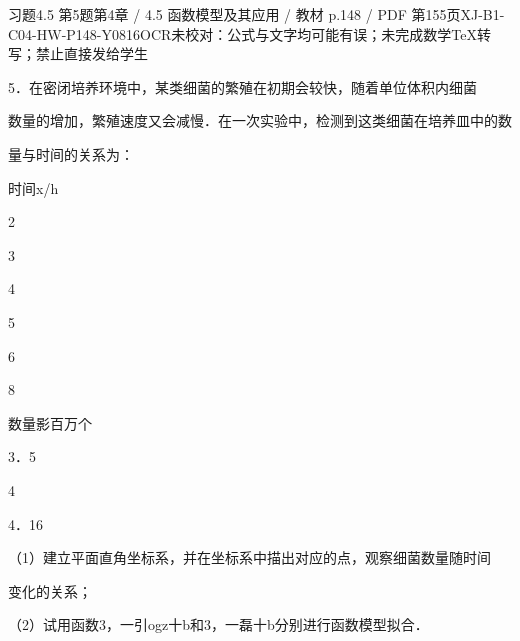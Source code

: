 \begin{bankitem}{习题4.5 第5题}{第4章 / 4.5 函数模型及其应用 / 教材 p.148 / PDF 第155页}{XJ-B1-C04-HW-P148-Y0816}{OCR未校对：公式与文字均可能有误；未完成数学TeX转写；禁止直接发给学生}
\begin{ocrdraft}
\par
5．在密闭培养环境中，某类细菌的繁殖在初期会较快，随着单位体积内细菌
\par
数量的增加，繁殖速度又会减慢．在一次实验中，检测到这类细菌在培养皿中的数
\par
量与时间的关系为：
\par
时间x/h
\par
2
\par
3
\par
4
\par
5
\par
6
\par
8
\par
数量影百万个
\par
3．5
\par
4
\par
4．16
\par
（1）建立平面直角坐标系，并在坐标系中描出对应的点，观察细菌数量随时间
\par
变化的关系；
\par
（2）试用函数3，一引ogz十b和3，一磊十b分别进行函数模型拟合．
\end{ocrdraft}
\end{bankitem}
